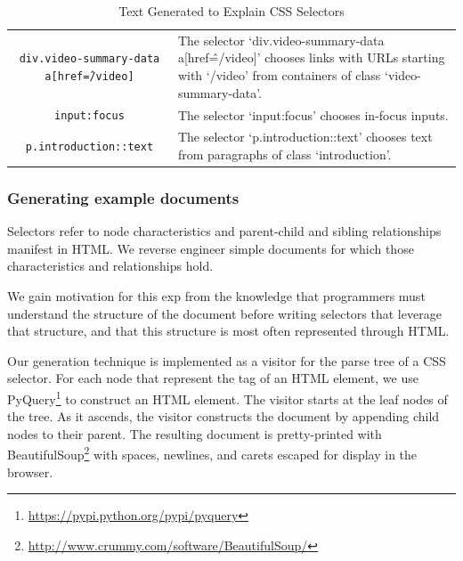 \begin{table}[t]
\caption{Text Generated to Explain CSS Selectors}
\label{tab:css_descriptions}
\centering
\begin{tabular}{ST}
\toprule
{} &  \\
\midrule
\texttt{div.video-summary-data a[href\^=/video]} & The selector `div.video-summary-data a[href\^=/video]' chooses links with URLs starting with `/video' from containers of class `video-summary-data'. \\ \midrule
\texttt{input:focus} & The selector `input:focus' chooses in-focus inputs. \\ \midrule
\texttt{p.introduction::text} & The selector `p.introduction::text' chooses text from paragraphs of class `introduction'. \\ \bottomrule
\end{tabular}
\end{table}

\subsubsection{Generating example documents}

\begin{changes}
Selectors refer to node characteristics and parent-child and sibling relationships manifest in HTML\@.
We reverse engineer simple documents for which those characteristics and relationships hold.
\end{changes}
{}
We gain motivation for this \gls{exp} from the knowledge that programmers must understand the structure of the document before writing selectors that leverage that structure, and that this structure is most often represented through HTML\@.
\fi

Our generation technique is implemented as a visitor for the parse tree of a CSS selector.
For each node that represent the tag of an HTML element, we use PyQuery\footnote{\url{https://pypi.python.org/pypi/pyquery}} to construct an HTML element.
The visitor starts at the leaf nodes of the tree.
As it ascends, the visitor constructs the document by appending child nodes to their parent.
The resulting document is pretty-printed with BeautifulSoup\footnote{\url{http://www.crummy.com/software/BeautifulSoup/}} with spaces, newlines, and carets escaped for display in the browser.

